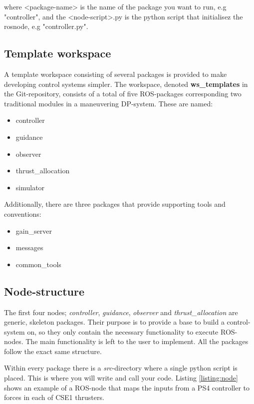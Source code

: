 where <package-name> is the name of the package you want to run, e.g "controller", and the <node-script>.py is the python script that initialisez the rosnode, e.g "controller.py". 

\subsection{Template workspace}

A template workspace consisting of several packages is provided to make developing control systems simpler. The workspace, denoted \textbf{ws\_templates} in the Git-repository, consists of a total of five ROS-packages corresponding two traditional modules in a maneuvering DP-system. These are named:

\begin{itemize}
    \item controller
    \item guidance
    \item observer
    \item thrust\_allocation
    \item simulator 
\end{itemize}

Additionally, there are three packages that provide supporting tools and conventions: 

\begin{itemize}
    \item gain\_server
    \item messages
    \item common\_tools
\end{itemize}

\subsection{Node-structure}

The first four nodes; \textit{controller}, \textit{guidance}, \textit{observer} and \textit{thrust\_allocation} are generic, skeleton packages. Their purpose is to provide a base to build a control-system on, so they only contain the necessary functionality to execute ROS-nodes. The main functionality is left to the user to implement. All the packages follow the exact same structure.

Within every package there is a \textit{src}-directory where a single python script is placed. This is where you will write and call your code. Listing \ref{listing:node} shows an example of a ROS-node that maps the inputs from a PS4 controller to forces in each of CSE1 thrusters. 


